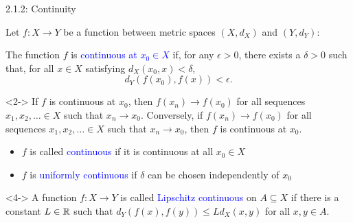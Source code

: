 \documentclass[10pt,english]{beamer}
\begin{document}
\begin{frame}{2.1.2: Continuity}

Let $f \colon X \rightarrow Y$ be a function between metric spaces $(X,d_X)$ and $(Y,d_Y)$:

\begin{definition}
The function $f$ is \textcolor{blue}{continuous at $x_0 \in X$} if, for any $\epsilon> 0$, there exists a $\delta >0$ such that, for all $x\in X$ satisfying $d_X(x_0,x)< \delta$, \vspace{-2mm}
\[ d_Y \left( f(x_0),f(x) \right) < \epsilon .\]
\end{definition}

\begin{theorem}<2-> 
If $f$ is continuous at $x_0$, then $f(x_n) \to f(x_0)$ for all sequences $x_1,x_2,\ldots \in X$ such that $x_n \to x_0$.
Conversely, if $f(x_n) \to f(x_0)$ for all sequences $x_1,x_2,\ldots  \in X$ such that $x_n \to x_0$, then $f$ is continuous at $x_0$.
\end{theorem}

\begin{itemize}
\setlength\itemsep{1.5mm}
\item<3-> $f$ is called \textcolor{blue}{continuous} if it is continuous at all $x_0 \in X$
\item<3-> $f$ is \textcolor{blue}{uniformly continuous} if $\delta$ can be chosen independently of $x_0$
\end{itemize}

\begin{definition}<4->
A function $f  \colon X \rightarrow Y$ is called \textcolor{blue}{Lipschitz continuous} on $A \subseteq X$ if there is a constant $L \in \mathbb{R}$ such that $d_Y (f(x),f(y)) \leq L d_X (x,y)$ for all $x,y\in A$.
\end{definition}



\end{frame}
\end{document}
